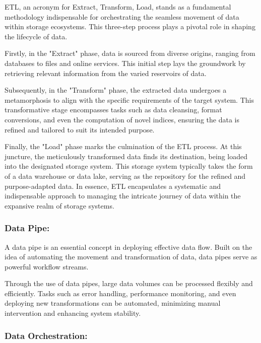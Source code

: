 ETL, an acronym for Extract, Transform, Load, stands as a fundamental
methodology indispensable for orchestrating the seamless movement of data within
storage ecosystems. This three-step process plays a pivotal role in shaping the
lifecycle of data.

Firstly, in the "Extract" phase, data is sourced from diverse origins, ranging
from databases to files and online services. This initial step lays the
groundwork by retrieving relevant information from the varied reservoirs of
data.

Subsequently, in the "Transform" phase, the extracted data undergoes a
metamorphosis to align with the specific requirements of the target system. This
transformative stage encompasses tasks such as data cleansing, format
conversions, and even the computation of novel indices, ensuring the data is
refined and tailored to suit its intended purpose.

Finally, the "Load" phase marks the culmination of the ETL process. At this
juncture, the meticulously transformed data finds its destination, being loaded
into the designated storage system. This storage system typically takes the form
of a data warehouse or data lake, serving as the repository for the refined and
purpose-adapted data. In essence, ETL encapsulates a systematic and
indispensable approach to managing the intricate journey of data within the
expansive realm of storage systems.

\subsubsection*{Data Pipe:}

A data pipe is an essential concept in deploying effective data flow. Built on
the idea of automating the movement and transformation of data, data pipes serve
as powerful workflow streams.

Through the use of data pipes, large data volumes can be processed flexibly and
efficiently. Tasks such as error handling, performance monitoring, and even
deploying new transformations can be automated, minimizing manual intervention
and enhancing system stability.


\subsubsection*{Data Orchestration:}


